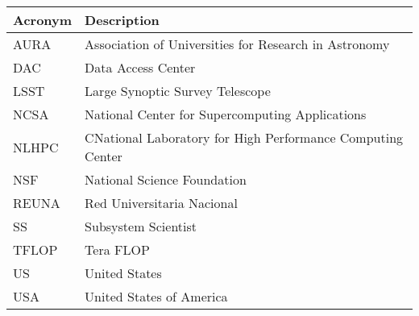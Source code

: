 \addtocounter{table}{-1}
\begin{longtable}{|l|p{}|}\hline 
\textbf{Acronym} & \textbf{Description}  \\\hline
AURA&Association of Universities for Research in Astronomy \\\hline
DAC&Data Access Center \\\hline
LSST&Large Synoptic Survey Telescope \\\hline
NCSA&National Center for Supercomputing Applications \\\hline
NLHPC&CNational Laboratory for High Performance Computing Center \\\hline
NSF&National Science Foundation \\\hline
REUNA&Red Universitaria Nacional \\\hline
SS&Subsystem Scientist \\\hline
TFLOP&Tera FLOP \\\hline
US&United States \\\hline
USA&United States of America \\\hline
\end{longtable} 
